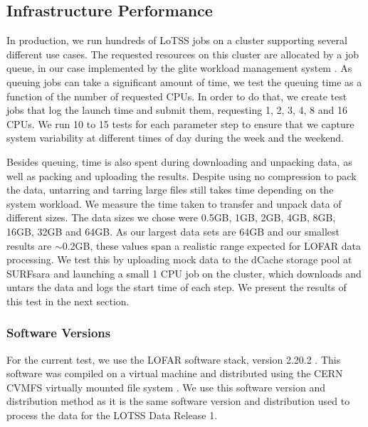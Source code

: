 \subsection{Infrastructure Performance}

In production, we run hundreds of LoTSS jobs on a cluster supporting several different use cases. The requested resources on this cluster are allocated by a job queue, in our case implemented by the glite workload management system \citep{glite-wms}. As queuing jobs can take a significant amount of time, we test the queuing time as a function of the number of requested CPUs. In order to do that, we create test jobs that log the launch time and submit them, requesting 1, 2, 3, 4, 8 and 16 CPUs. We run 10 to 15 tests for each parameter step to ensure that we capture system variability at different times of day during the week and the weekend. 

Besides queuing, time is also spent during downloading and unpacking data, as well as packing and uploading the results. Despite using no compression to pack the data, untarring and tarring large files still takes time depending on the system workload. We measure the time taken to transfer and unpack data of different sizes. The data sizes we chose were 0.5GB, 1GB, 2GB, 4GB, 8GB, 16GB, 32GB and 64GB. As our largest data sets are 64GB and our smallest results are $\sim$0.2GB, these values span a realistic range expected for LOFAR data processing. We test this by uploading mock data to the dCache storage pool at SURFsara and launching a small 1 CPU job on the cluster, which downloads and untars the data and logs the start time of each step. We present the results of this test in the next section. 


\subsubsection{Software Versions}\label{sec:ch6_software_versions}
For the current test, we use the LOFAR software stack, version 2.20.2 \citep{cookbook}. This software was compiled on a virtual machine and distributed using the CERN CVMFS virtually mounted file system \citep{cvmfs2008}. We use this software version and distribution method as it is the same software version and distribution used to process the data for the LOTSS Data Release 1. 

